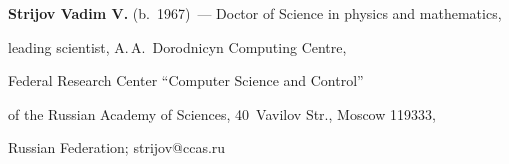 \noindent

\textbf{Strijov Vadim V.} (b.\ 1967)~--- Doctor of Science in physics and mathematics, 

leading scientist, A.\,A.~Dorodnicyn Computing Centre, 

Federal Research Center ``Computer Science and Control'' 

of the Russian Academy of Sciences, 40~Vavilov Str., Moscow 119333, 

Russian Federation; \mbox{strijov@ccas.ru}

\label{end\stat}





\renewcommand{\bibname}{\protect\rm Литература}

